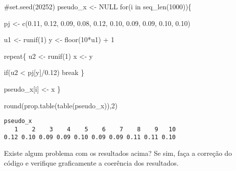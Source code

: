 \documentclass[
  letterpaper,
  DIV=11,
  numbers=noendperiod]{scrreprt}
\newenvironment{Shaded}{\begin{snugshade}}{\end{snugshade}}
\newcommand{\CommentTok}[1]{\textcolor[rgb]{0.37,0.37,0.37}{#1}}
\newcommand{\ConstantTok}[1]{\textcolor[rgb]{0.56,0.35,0.01}{#1}}
\newcommand{\ControlFlowTok}[1]{\textcolor[rgb]{0.00,0.23,0.31}{#1}}
\newcommand{\DecValTok}[1]{\textcolor[rgb]{0.68,0.00,0.00}{#1}}
\newcommand{\FloatTok}[1]{\textcolor[rgb]{0.68,0.00,0.00}{#1}}
\newcommand{\FunctionTok}[1]{\textcolor[rgb]{0.28,0.35,0.67}{#1}}
\newcommand{\NormalTok}[1]{\textcolor[rgb]{0.00,0.23,0.31}{#1}}
\newcommand{\OtherTok}[1]{\textcolor[rgb]{0.00,0.23,0.31}{#1}}
\newcommand{\SpecialCharTok}[1]{\textcolor[rgb]{0.37,0.37,0.37}{#1}}
\begin{document}
\begin{Shaded}
\begin{Highlighting}[]
\CommentTok{\#set.seed(20252)}
\NormalTok{pseudo\_x }\OtherTok{\textless{}{-}} \ConstantTok{NULL}
\ControlFlowTok{for}\NormalTok{(i }\ControlFlowTok{in} \FunctionTok{seq\_len}\NormalTok{(}\DecValTok{1000}\NormalTok{))\{}
  
\NormalTok{pj }\OtherTok{\textless{}{-}} \FunctionTok{c}\NormalTok{(}\FloatTok{0.11}\NormalTok{, }\FloatTok{0.12}\NormalTok{, }\FloatTok{0.09}\NormalTok{, }\FloatTok{0.08}\NormalTok{, }\FloatTok{0.12}\NormalTok{, }\FloatTok{0.10}\NormalTok{, }\FloatTok{0.09}\NormalTok{, }\FloatTok{0.09}\NormalTok{, }\FloatTok{0.10}\NormalTok{, }\FloatTok{0.10}\NormalTok{)}

\NormalTok{u1 }\OtherTok{\textless{}{-}} \FunctionTok{runif}\NormalTok{(}\DecValTok{1}\NormalTok{)}
\NormalTok{y }\OtherTok{\textless{}{-}} \FunctionTok{floor}\NormalTok{(}\DecValTok{10}\SpecialCharTok{*}\NormalTok{u1) }\SpecialCharTok{+} \DecValTok{1}


\ControlFlowTok{repeat}\NormalTok{\{}
\NormalTok{u2 }\OtherTok{\textless{}{-}} \FunctionTok{runif}\NormalTok{(}\DecValTok{1}\NormalTok{)}
\NormalTok{x }\OtherTok{\textless{}{-}}\NormalTok{ y}

\ControlFlowTok{if}\NormalTok{(u2 }\SpecialCharTok{\textless{}}\NormalTok{ pj[y]}\SpecialCharTok{/}\FloatTok{0.12}\NormalTok{) }\ControlFlowTok{break}
\NormalTok{\}}

\NormalTok{pseudo\_x[i] }\OtherTok{\textless{}{-}}\NormalTok{ x}
\NormalTok{\}}

\FunctionTok{round}\NormalTok{(}\FunctionTok{prop.table}\NormalTok{(}\FunctionTok{table}\NormalTok{(pseudo\_x)),}\DecValTok{2}\NormalTok{)}
\end{Highlighting}
\end{Shaded}

\begin{verbatim}
pseudo_x
   1    2    3    4    5    6    7    8    9   10 
0.12 0.10 0.09 0.09 0.10 0.09 0.09 0.11 0.11 0.10 
\end{verbatim}

Existe algum problema com os resultados acima? Se sim, faça a correção
do código e verifique graficamente a coerência dos resultados.
\end{document}
